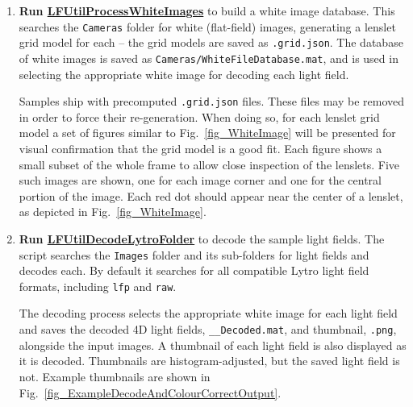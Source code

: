 \documentclass[onecolumn]{article}
\newcommand{\CiteFunction}[1]{\hyperlink{#1}{\small #1}}
\newcommand{\SymbolText}[1]{\texttt{\small #1}}
\begin{document}
\begin{enumerate}[leftmargin=1.5em,rightmargin=0.5cm]
\item \textbf{Run \CiteFunction{LFUtilProcessWhiteImages}} to build a white image database. This searches the \SymbolText{Cameras} folder for white (flat-field) images, generating a lenslet grid model for each -- the grid models are saved as \SymbolText{*.grid.json}. The database of white images is saved as \SymbolText{Cameras/WhiteFileDatabase.mat}, and is used in selecting the appropriate white image for decoding each light field. 

Samples ship with precomputed \SymbolText{.grid.json} files. These files may be removed in order to force their re-generation.  When doing so, for each lenslet grid model a set of figures similar to Fig.~\ref{fig_WhiteImage} will be presented for visual confirmation that the grid model is a good fit. Each figure shows a small subset of the whole frame to allow close inspection of the lenslets. Five such images are shown, one for each image corner and one for the central portion of the image. Each red dot should appear near the center of a lenslet, as depicted in Fig.~\ref{fig_WhiteImage}.

\item \textbf{Run \CiteFunction{LFUtilDecodeLytroFolder}} to decode the sample light fields. The script searches the \SymbolText{Images} folder and its sub-folders for light fields and decodes each.  By default it searches for all compatible Lytro light field formats, including \SymbolText{lfp} and \SymbolText{raw}.

The decoding process selects the appropriate white image for each light field and saves the decoded 4D light fields, \SymbolText{*\_\_Decoded.mat}, and thumbnail, \SymbolText{*.png}, alongside the input images. A thumbnail of each light field is also displayed as it is decoded. Thumbnails are histogram-adjusted, but the saved light field is not. Example thumbnails are shown in Fig.~\ref{fig_ExampleDecodeAndColourCorrectOutput}.


\end{enumerate}
\end{document}
